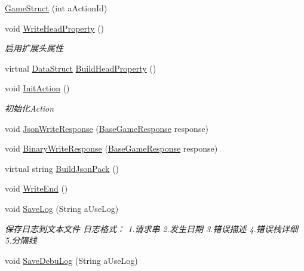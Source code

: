 \begin{DoxyCompactItemize}
\item 
\mbox{\hyperlink{class_t_net_1_1_service_1_1_game_struct_a7cf0bcaa50b4eb3fde9f0ee110d39ba9}{Game\+Struct}} (int a\+Action\+Id)
\item 
void \mbox{\hyperlink{class_t_net_1_1_service_1_1_game_struct_aed2b7424e441fbbc9f71be029e5d7110}{Write\+Head\+Property}} ()
\begin{DoxyCompactList}\small\item\em 启用扩展头属性 \end{DoxyCompactList}\item 
virtual \mbox{\hyperlink{class_t_net_1_1_service_1_1_data_struct}{Data\+Struct}} \mbox{\hyperlink{class_t_net_1_1_service_1_1_game_struct_ab270ca4b2b5bc29167ec5ee17b5dcb96}{Build\+Head\+Property}} ()
\item 
void \mbox{\hyperlink{class_t_net_1_1_service_1_1_game_struct_af71c98eeb85755b370345f098b69c53f}{Init\+Action}} ()
\begin{DoxyCompactList}\small\item\em 初始化\+Action \end{DoxyCompactList}\item 
void \mbox{\hyperlink{class_t_net_1_1_service_1_1_game_struct_ad9532e98fc145bc12144abfc283e24db}{Json\+Write\+Response}} (\mbox{\hyperlink{class_t_net_1_1_service_1_1_base_game_response}{Base\+Game\+Response}} response)
\item 
void \mbox{\hyperlink{class_t_net_1_1_service_1_1_game_struct_a1eaba10db782e5f64762c903f65d1dfa}{Binary\+Write\+Response}} (\mbox{\hyperlink{class_t_net_1_1_service_1_1_base_game_response}{Base\+Game\+Response}} response)
\item 
virtual string \mbox{\hyperlink{class_t_net_1_1_service_1_1_game_struct_a629b46371ae918050fc7c69aee789d92}{Build\+Json\+Pack}} ()
\item 
void \mbox{\hyperlink{class_t_net_1_1_service_1_1_game_struct_ae81531de2c4e37dfcbb9091ba25c61f0}{Write\+End}} ()
\item 
void \mbox{\hyperlink{class_t_net_1_1_service_1_1_game_struct_acf020d2386804787d7fff55bbd1c8acf}{Save\+Log}} (String a\+Use\+Log)
\begin{DoxyCompactList}\small\item\em 保存日志到文本文件 日志格式： 1.请求串 2.发生日期 3.错误描述 4.错误栈详细 5.分隔线 \end{DoxyCompactList}\item 
void \mbox{\hyperlink{class_t_net_1_1_service_1_1_game_struct_ae091434de292dd9294e2bdf950ef3c55}{Save\+Debu\+Log}} (String a\+Use\+Log)

\end{DoxyCompactItemize}
